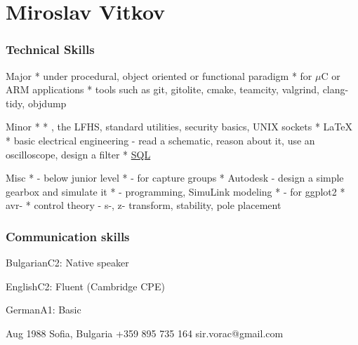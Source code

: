 \documentclass{tccv}
\begin{document}


\part{Miroslav Vitkov}


\section{Technical Skills}
\begin{factlist}
\item{Major}
{
     *  under procedural, object oriented or functional paradigm  \mynext
     *  for $\mu$C or ARM applications  \mynext
     * tools such as git, gitolite, cmake, teamcity, valgrind, clang-tidy, objdump
}
\\
\item{Minor}
{
    *   \mynext
    * , the LFHS, standard utilities, security basics, UNIX sockets  \mynext
    * \LaTeX  \mynext
    * basic electrical engineering - read a schematic, reason about it, use an oscilloscope, design a filter  \mynext
    * {\href{https://github.com/MiroslavVitkov/scripts/tree/master/db/init.sh}{SQL}}
}
\\
\item{Misc}
{
    *  - below junior level  \mynext
    *  - for capture groups  \mynext
    * Autodesk  - design a simple gearbox and simulate it  \mynext
    *  - programming, SimuLink modeling  \mynext
    *  - for ggplot2  \mynext
    * avr-  \mynext
    * control theory - s-, z- transform, stability, pole placement
}
\end{factlist}


\section{Communication skills}
\begin{factlist}
\item{Bulgarian}{C2: Native speaker}
\item{English}{C2: Fluent (Cambridge CPE)}
\item{German}{A1: Basic}
\end{factlist}


\mypersonal
    {Aug 1988}
    {Sofia, Bulgaria}
    {+359 895 735 164}
    {sir.vorac@gmail.com}
\end{document}
